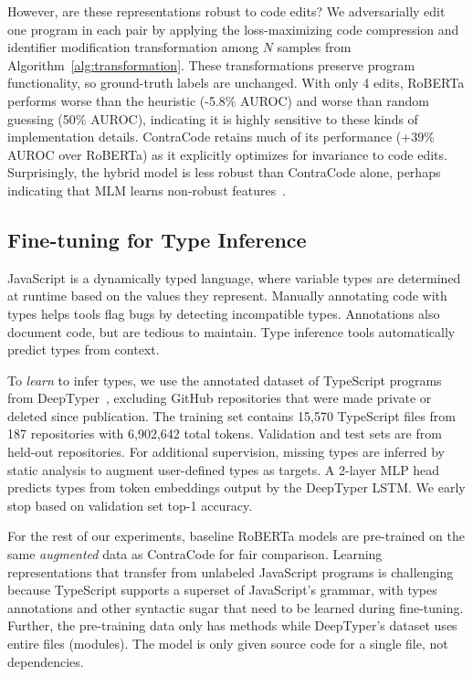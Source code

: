 \documentclass[11pt]{article}
\newcommand{\ours}[0]{ContraCode}
\begin{document}
However, are these representations robust to code edits? We adversarially edit one program in each pair by applying the loss-maximizing code compression and identifier modification transformation among $N$ samples from Algorithm~\ref{alg:transformation}. These transformations preserve program functionality, so ground-truth labels are unchanged. With only 4 edits, RoBERTa performs worse than the heuristic (-5.8\% AUROC) and worse than random guessing (50\% AUROC), indicating it is highly sensitive to these kinds of implementation details. \ours{} retains much of its performance (+39\% AUROC over RoBERTa) as it explicitly optimizes for invariance to code edits. Surprisingly, the hybrid model is less robust than \ours{} alone, perhaps indicating that MLM learns non-robust features~\cite{NEURIPS2019_e2c420d9}.

\subsection{Fine-tuning for Type Inference}
\label{sec:experiments_type_inference}
JavaScript is a dynamically typed language, where variable types are determined at runtime based on the values they represent. Manually annotating code with types helps tools flag bugs by detecting incompatible types. Annotations also document code, but are tedious to maintain. Type inference tools automatically predict types from context.

To \textit{learn} to infer types, we use the annotated dataset of TypeScript programs from DeepTyper~\citep{hellendoorn2018deep}, excluding GitHub repositories that were made private or deleted since publication.
The training set contains 15,570 TypeScript files from 187 repositories with 6,902,642 total tokens. Validation and test sets are from held-out repositories.
For additional supervision, missing types are inferred by static analysis to augment user-defined types as targets.
A 2-layer MLP head predicts types from token embeddings output by the DeepTyper LSTM. We early stop based on validation set top-1 accuracy.

For the rest of our experiments, baseline RoBERTa models are pre-trained on the same \textit{augmented} data as \ours{} for fair comparison. Learning representations that transfer from unlabeled JavaScript programs is challenging because TypeScript supports a superset of JavaScript's grammar, with types annotations and other syntactic sugar that need to be learned during fine-tuning. Further, the pre-training data only has methods while DeepTyper's dataset uses entire files (modules). 
The model is only given source code for a single file, not dependencies.
\end{document}
